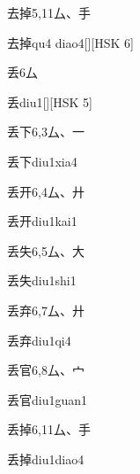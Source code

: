 \begin{entry}{去掉}{5,11}{⼛、⼿}
  \begin{phonetics}{去掉}{qu4 diao4}[][HSK 6]
  \end{phonetics}
\end{entry}

\begin{entry}{丢}{6}{⼛}
  \begin{phonetics}{丢}{diu1}[][HSK 5]
  \end{phonetics}
\end{entry}

\begin{entry}{丢下}{6,3}{⼛、⼀}
  \begin{phonetics}{丢下}{diu1xia4}
  \end{phonetics}
\end{entry}

\begin{entry}{丢开}{6,4}{⼛、⼶}
  \begin{phonetics}{丢开}{diu1kai1}
  \end{phonetics}
\end{entry}

\begin{entry}{丢失}{6,5}{⼛、⼤}
  \begin{phonetics}{丢失}{diu1shi1}
  \end{phonetics}
\end{entry}

\begin{entry}{丢弃}{6,7}{⼛、⼶}
  \begin{phonetics}{丢弃}{diu1qi4}
  \end{phonetics}
\end{entry}

\begin{entry}{丢官}{6,8}{⼛、⼧}
  \begin{phonetics}{丢官}{diu1guan1}
  \end{phonetics}
\end{entry}

\begin{entry}{丢掉}{6,11}{⼛、⼿}
  \begin{phonetics}{丢掉}{diu1diao4}
  \end{phonetics}
\end{entry}

